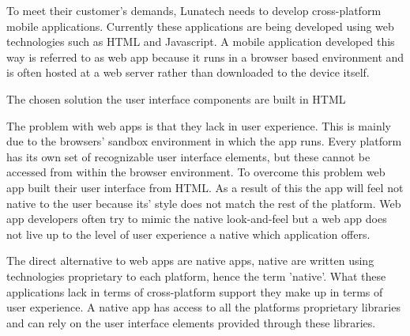 

To meet their customer's demands, Lunatech needs to develop cross-platform mobile applications. Currently these applications are being developed using web technologies such as HTML and Javascript. A mobile application developed this way is referred to as web app because it runs in a browser based environment and is often hosted at a web server rather than downloaded to the device itself.


The chosen solution the user interface components are built in HTML


The problem with web apps is that they lack in user experience. This is mainly due to the browsers' sandbox environment in which the app runs. Every platform has its own set of recognizable user interface elements, but these cannot be accessed from within the browser environment. To overcome this problem web app built their user interface from HTML.  As a result of this the app will feel not native to the user because its' style does not match the rest of the platform. Web app developers often try to mimic the native look-and-feel but a web app does not live up to the level of user experience a native which application offers. 


The direct alternative to web apps are native apps, native are written using technologies proprietary to each platform, hence the term 'native'. What these applications lack in terms of cross-platform support they make up in terms of user experience.  A native app has access to all the platforms proprietary libraries and can rely on the user interface elements provided through these libraries.

